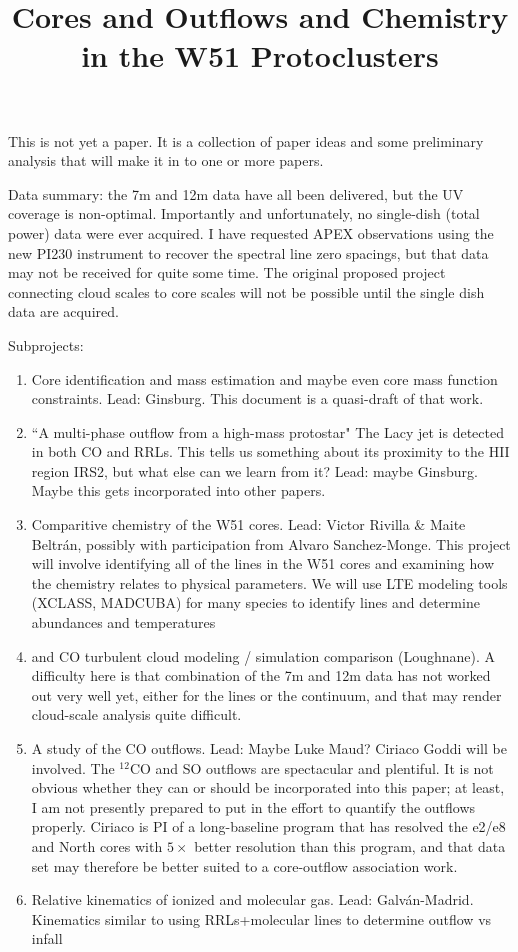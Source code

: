 \documentclass{aa}
\begin{document}
\title{Cores and Outflows and Chemistry in the W51 Protoclusters}

This is not yet a paper.  It is a collection of paper ideas and some 
preliminary analysis that will make it in to one or more papers.

Data summary: the 7m and 12m data have all been delivered, but the UV coverage
is non-optimal.  Importantly and unfortunately, no single-dish (total power)
data were ever acquired.  I have requested APEX observations using the new
PI230 instrument to recover the spectral line zero spacings, but that data may
not be received for quite some time.  The original proposed project connecting
cloud scales to core scales will not be possible until the single dish data are
acquired.


Subprojects:
\begin{enumerate}
    \item Core identification and mass estimation and maybe even
        core mass function constraints.  Lead: Ginsburg.  This document
        is a quasi-draft of that work.
    \item ``A multi-phase outflow from a high-mass protostar"
        The Lacy jet is detected in both CO and RRLs.  This tells us something
        about its proximity to the HII region IRS2, but what else can we learn
        from it?  Lead: maybe Ginsburg.  Maybe this gets incorporated
        into other papers.
    \item Comparitive chemistry of the W51 cores.  Lead: Victor Rivilla \&
        Maite Beltr{\'a}n, possibly with participation from Alvaro
        Sanchez-Monge.
        This project will involve identifying all of the lines in the W51 cores
        and examining how the chemistry relates to physical parameters.
        We will use LTE modeling tools (XCLASS, MADCUBA) for many species to
        identify lines and determine abundances and temperatures
    \item \formaldehyde and CO turbulent cloud modeling / simulation comparison
        (Loughnane).  A difficulty here is that combination of the 7m and 12m
        data has not worked out very well yet, either for the lines or the
        continuum, and that may render cloud-scale analysis quite difficult.
    \item A study of the CO outflows.  Lead: Maybe Luke Maud?  Ciriaco Goddi
        will be involved.  The $^{12}$CO and SO outflows are spectacular and
        plentiful.  It is not obvious whether they can or should be
        incorporated into this paper; at least, I am not presently prepared to
        put in the effort to quantify the outflows properly.  Ciriaco is PI of
        a long-baseline program that has resolved the e2/e8 and North cores
        with $5\times$ better resolution than this program, and that data set
        may therefore be better suited to a core-outflow association work.
    \item Relative kinematics of ionized and molecular gas.  Lead: Galv{\'a}n-Madrid.
        Kinematics similar to \citet{Keto2008a} using RRLs+molecular lines to determine
        outflow vs infall
        
\end{enumerate}
\end{document}
